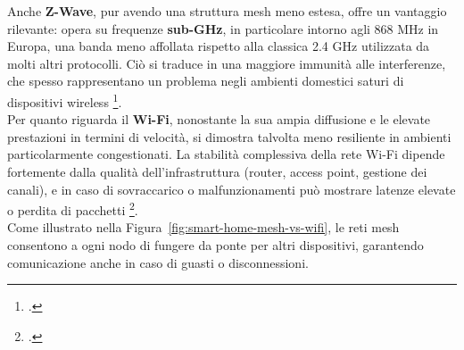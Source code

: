 Anche \textbf{Z-Wave}, pur avendo una struttura mesh meno estesa, offre un vantaggio rilevante: opera su frequenze \textbf{sub-GHz}, in particolare intorno agli 868 MHz in Europa, una banda meno affollata rispetto alla classica 2.4 GHz utilizzata da molti altri protocolli. Ciò si traduce in una maggiore immunità alle interferenze, che spesso rappresentano un problema negli ambienti domestici saturi di dispositivi wireless \footcite{zwave-spec}.\\

Per quanto riguarda il \textbf{Wi-Fi}, nonostante la sua ampia diffusione e le elevate prestazioni in termini di velocità, si dimostra talvolta meno resiliente in ambienti particolarmente congestionati. La stabilità complessiva della rete Wi-Fi dipende fortemente dalla qualità dell'infrastruttura (router, access point, gestione dei canali), e in caso di sovraccarico o malfunzionamenti può mostrare latenze elevate o perdita di pacchetti \footcite{wifi6-spec}.\\

Come illustrato nella Figura~\ref{fig:smart-home-mesh-vs-wifi}, le reti mesh consentono a ogni nodo di fungere da ponte per altri dispositivi, garantendo comunicazione anche in caso di guasti o disconnessioni.

